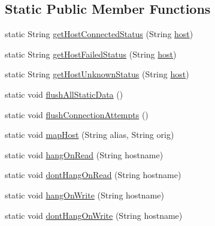 \subsection*{Static Public Member Functions}
\begin{DoxyCompactItemize}
\item 
static String \mbox{\hyperlink{classtestsuite_1_1_unreliable_socket_factory_abd363b9f8118fa57b02cf4cab0250b9d}{get\+Host\+Connected\+Status}} (String \mbox{\hyperlink{classcom_1_1mysql_1_1cj_1_1protocol_1_1_standard_socket_factory_a61a6781433c3290f82de3629497c74c5}{host}})
\item 
static String \mbox{\hyperlink{classtestsuite_1_1_unreliable_socket_factory_a8ab985cf1e065c50b61ef58babcec4df}{get\+Host\+Failed\+Status}} (String \mbox{\hyperlink{classcom_1_1mysql_1_1cj_1_1protocol_1_1_standard_socket_factory_a61a6781433c3290f82de3629497c74c5}{host}})
\item 
static String \mbox{\hyperlink{classtestsuite_1_1_unreliable_socket_factory_a7a32e894d7bc4c7667f51c92919db087}{get\+Host\+Unknown\+Status}} (String \mbox{\hyperlink{classcom_1_1mysql_1_1cj_1_1protocol_1_1_standard_socket_factory_a61a6781433c3290f82de3629497c74c5}{host}})
\item 
static void \mbox{\hyperlink{classtestsuite_1_1_unreliable_socket_factory_a28422cfdbb2523a906bcbff264195687}{flush\+All\+Static\+Data}} ()
\item 
static void \mbox{\hyperlink{classtestsuite_1_1_unreliable_socket_factory_a976583ae43c3337696f2a1cb509fe2d0}{flush\+Connection\+Attempts}} ()
\item 
static void \mbox{\hyperlink{classtestsuite_1_1_unreliable_socket_factory_a4b8431541613eb3aadd17fc81fe12c7f}{map\+Host}} (String alias, String orig)
\item 
static void \mbox{\hyperlink{classtestsuite_1_1_unreliable_socket_factory_aa884cd5e45c61e73130fd6e56a64a05a}{hang\+On\+Read}} (String hostname)
\item 
static void \mbox{\hyperlink{classtestsuite_1_1_unreliable_socket_factory_ace34957ad762b9074f4b4ff436a5f2d3}{dont\+Hang\+On\+Read}} (String hostname)
\item 
static void \mbox{\hyperlink{classtestsuite_1_1_unreliable_socket_factory_a4d89c3537b07019cbf118394fc4726d4}{hang\+On\+Write}} (String hostname)
\item 
static void \mbox{\hyperlink{classtestsuite_1_1_unreliable_socket_factory_acc8516ff4e8a54b7f1c34e88647abeae}{dont\+Hang\+On\+Write}} (String hostname)
\item 

\end{DoxyCompactItemize}
